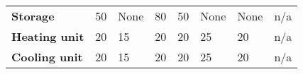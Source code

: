 \begin{landscape}
\begin{table}[h]
\begin{tabular}{llllllll}
\textbf{Storage}                                                                      & 50                                                                                 & None                                                                               & 80                                                                   & 50                                                                                & None                                                                          & None                                                                 & n/a                                                                          \\
\textbf{Heating unit}                                                                 & 20                                                                                 & 15                                                                                 & 20                                                                   & 20                                                                                & 25                                                                            & 20                                                                   & n/a                                                                          \\
\textbf{Cooling unit}                                                                 & 20                                                                                 & 15                                                                                 & 20                                                                   & 20                                                                                & 25                                                                            & 20                                                                   & n/a                                                                          \\

\end{tabular}
\end{table}
\end{landscape}

